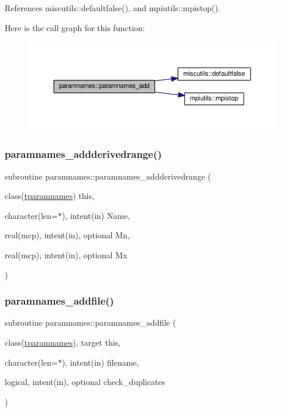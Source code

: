 References miscutils\+::defaultfalse(), and mpiutils\+::mpistop().

Here is the call graph for this function\+:
\nopagebreak
\begin{figure}[H]
\begin{center}
\leavevmode
\includegraphics[width=350pt]{namespaceparamnames_a6f6eda35d34074cc502b9beddae16e62_cgraph}
\end{center}
\end{figure}
\mbox{\label{namespaceparamnames_ad8c375d5eebfce2aba8f0b4de825f220}} 
\subsubsection{\texorpdfstring{paramnames\+\_\+addderivedrange()}{paramnames\_addderivedrange()}}
{\footnotesize\ttfamily subroutine paramnames\+::paramnames\+\_\+addderivedrange (\begin{DoxyParamCaption}\item[{class(\mbox{\hyperlink{structparamnames_1_1tparamnames}{tparamnames}})}]{this,  }\item[{character(len=$\ast$), intent(in)}]{Name,  }\item[{real(mcp), intent(in), optional}]{Mn,  }\item[{real(mcp), intent(in), optional}]{Mx }\end{DoxyParamCaption})}

\mbox{\label{namespaceparamnames_a962b36a1c8121b164c4206bdc3223ea7}} 
\subsubsection{\texorpdfstring{paramnames\+\_\+addfile()}{paramnames\_addfile()}}
{\footnotesize\ttfamily subroutine paramnames\+::paramnames\+\_\+addfile (\begin{DoxyParamCaption}\item[{class(\mbox{\hyperlink{structparamnames_1_1tparamnames}{tparamnames}}), target}]{this,  }\item[{character(len=$\ast$), intent(in)}]{filename,  }\item[{logical, intent(in), optional}]{check\+\_\+duplicates }\end{DoxyParamCaption})\hspace{0.3cm}{\ttfamily [private]}}

